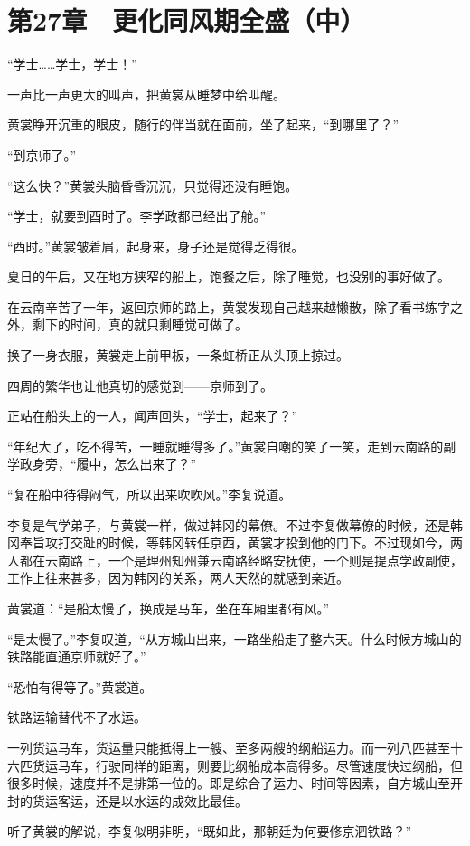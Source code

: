 \section{第27章　更化同风期全盛（中）}

“学士……学士，学士！”

一声比一声更大的叫声，把黄裳从睡梦中给叫醒。

黄裳睁开沉重的眼皮，随行的伴当就在面前，坐了起来，“到哪里了？”

“到京师了。”

“这么快？”黄裳头脑昏昏沉沉，只觉得还没有睡饱。

“学士，就要到酉时了。李学政都已经出了舱。”

“酉时。”黄裳皱着眉，起身来，身子还是觉得乏得很。

夏日的午后，又在地方狭窄的船上，饱餐之后，除了睡觉，也没别的事好做了。

在云南辛苦了一年，返回京师的路上，黄裳发现自己越来越懒散，除了看书练字之外，剩下的时间，真的就只剩睡觉可做了。

换了一身衣服，黄裳走上前甲板，一条虹桥正从头顶上掠过。

四周的繁华也让他真切的感觉到——京师到了。

正站在船头上的一人，闻声回头，“学士，起来了？”

“年纪大了，吃不得苦，一睡就睡得多了。”黄裳自嘲的笑了一笑，走到云南路的副学政身旁，“履中，怎么出来了？”

“复在船中待得闷气，所以出来吹吹风。”李复说道。

李复是气学弟子，与黄裳一样，做过韩冈的幕僚。不过李复做幕僚的时候，还是韩冈奉旨攻打交趾的时候，等韩冈转任京西，黄裳才投到他的门下。不过现如今，两人都在云南路上，一个是理州知州兼云南路经略安抚使，一个则是提点学政副使，工作上往来甚多，因为韩冈的关系，两人天然的就感到亲近。

黄裳道：“是船太慢了，换成是马车，坐在车厢里都有风。”

“是太慢了。”李复叹道，“从方城山出来，一路坐船走了整六天。什么时候方城山的铁路能直通京师就好了。”

“恐怕有得等了。”黄裳道。

铁路运输替代不了水运。

一列货运马车，货运量只能抵得上一艘、至多两艘的纲船运力。而一列八匹甚至十六匹货运马车，行驶同样的距离，则要比纲船成本高得多。尽管速度快过纲船，但很多时候，速度并不是排第一位的。即是综合了运力、时间等因素，自方城山至开封的货运客运，还是以水运的成效比最佳。

听了黄裳的解说，李复似明非明，“既如此，那朝廷为何要修京泗铁路？”

